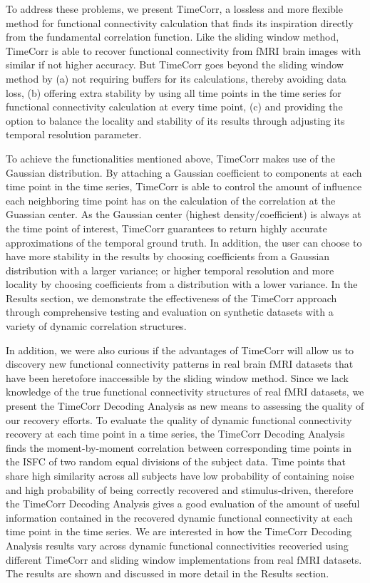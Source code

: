 \documentclass[11pt]{article}
\begin{document}
To address these problems, we present TimeCorr, a lossless and more flexible method for functional connectivity calculation that finds its inspiration directly from the fundamental correlation function. Like the sliding window method, TimeCorr is able to recover functional connectivity from fMRI brain images with similar if not higher accuracy. But TimeCorr goes beyond the sliding window method by (a) not requiring buffers for its calculations, thereby avoiding data loss, (b) offering extra stability by using all time points in the time series for functional connectivity calculation at every time point, (c) and providing the option to balance the locality and stability of its results through adjusting its temporal resolution parameter.

To achieve the functionalities mentioned above, TimeCorr makes use of the Gaussian distribution. By attaching a Gaussian coefficient to components at each time point in the time series, TimeCorr is able to control the amount of influence each neighboring time point has on the calculation of the correlation at the Guassian center. As the Gaussian center (highest density/coefficient) is always at the time point of interest, TimeCorr guarantees to return highly accurate approximations of the temporal ground truth. In addition, the user can choose to have more stability in the results by choosing coefficients from a Gaussian distribution with a larger variance; or higher temporal resolution and more locality by choosing coefficients from a distribution with a lower variance. In the Results section, we demonstrate the effectiveness of the TimeCorr approach through comprehensive testing and evaluation on synthetic datasets with a variety of dynamic correlation structures.

In addition, we were also curious if the advantages of TimeCorr will allow us to discovery new functional connectivity patterns in real brain fMRI datasets that have been heretofore inaccessible by the sliding window method. Since we lack knowledge of the true functional connectivity structures of real fMRI datasets, we present the TimeCorr Decoding Analysis as new means to assessing the quality of our recovery efforts. To evaluate the quality of dynamic functional connectivity recovery at each time point in a time series, the TimeCorr Decoding Analysis finds the moment-by-moment correlation between corresponding time points in the ISFC of two random equal divisions of the subject data. Time points that share high similarity across all subjects have low probability of containing noise and high probability of being correctly recovered and stimulus-driven, therefore the TimeCorr Decoding Analysis gives a good evaluation of the amount of useful information contained in the recovered dynamic functional connectivity at each time point in the time series. We are interested in how the TimeCorr Decoding Analysis results vary across dynamic functional connectivities recoveried using different TimeCorr and sliding window implementations from real fMRI datasets. The results are shown and discussed in more detail in the Results section.
\end{document}
